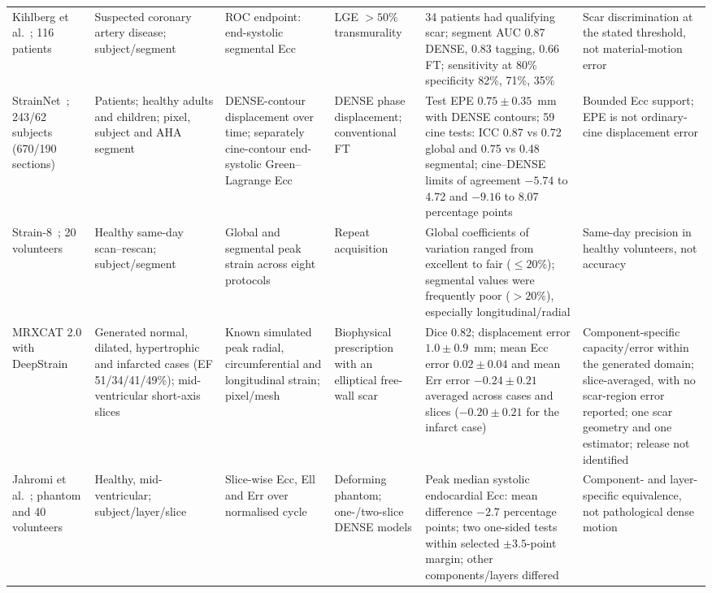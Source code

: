 {\begin{longtable}{L{0.124\textwidth}L{0.146\textwidth}L{0.157\textwidth}L{0.146\textwidth}L{0.225\textwidth}L{0.112\textwidth}}
\addlinespace
Kihlberg et al.~\cite{kihlberg2020clinical}; 116 patients & Suspected coronary artery disease; subject/segment & ROC endpoint: end-systolic segmental Ecc & LGE $>50\%$ transmurality & 34 patients had qualifying scar; segment AUC 0.87 DENSE, 0.83 tagging, 0.66 FT; sensitivity at 80\% specificity 82\%, 71\%, 35\% & Scar discrimination at the stated threshold, not material-motion error \\
\addlinespace
StrainNet~\cite{wang2023strainnet}; 243/62 subjects (670/190 sections) & Patients; healthy adults and children; pixel, subject and AHA segment & DENSE-contour displacement over time; separately cine-contour end-systolic Green--Lagrange Ecc & DENSE phase displacement; conventional FT & Test EPE \(0.75\pm0.35\)~mm with DENSE contours; 59 cine tests: ICC 0.87 vs 0.72 global and 0.75 vs 0.48 segmental; cine--DENSE limits of agreement \(-5.74\) to 4.72 and \(-9.16\) to 8.07 percentage points & Bounded Ecc support; EPE is not ordinary-cine displacement error \\
\addlinespace
Strain-8~\cite{bell2025strain8}; 20 volunteers & Healthy same-day scan--rescan; subject/segment & Global and segmental peak strain across eight protocols & Repeat acquisition & Global coefficients of variation ranged from excellent to fair ($\leq20\%$); segmental values were frequently poor ($>20\%$), especially longitudinal/radial & Same-day precision in healthy volunteers, not accuracy \\
\addlinespace
MRXCAT 2.0 with DeepStrain~\cite{mrxcat2023,morales2021} & Generated normal, dilated, hypertrophic and infarcted cases (EF 51/34/41/49\%); mid-ventricular short-axis slices & Known simulated peak radial, circumferential and longitudinal strain; pixel/mesh & Biophysical prescription with an elliptical free-wall scar & Dice 0.82; displacement error \(1.0\pm0.9\)~mm; mean Ecc error \(0.02\pm0.04\) and mean Err error \(-0.24\pm0.21\) averaged across cases and slices (\(-0.20\pm0.21\) for the infarct case) & Component-specific capacity/error within the generated domain; slice-averaged, with no scar-region error reported; one scar geometry and one estimator; release not identified \\
\addlinespace
Jahromi et al.~\cite{jahromi2026densecine}; phantom and 40 volunteers & Healthy, mid-ventricular; subject/layer/slice & Slice-wise Ecc, Ell and Err over normalised cycle & Deforming phantom; one-/two-slice DENSE models & Peak median systolic endocardial Ecc: mean difference \(-2.7\) percentage points; two one-sided tests within selected \(\pm3.5\)-point margin; other components/layers differed & Component- and layer-specific equivalence, not pathological dense motion \\
\bottomrule
\end{longtable}
}


